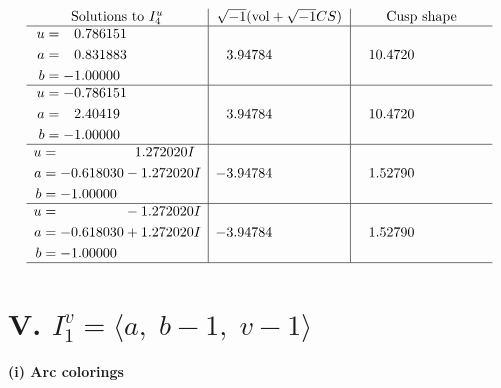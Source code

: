\documentclass[1p]{elsarticle_modified}
\theoremstyle{definition}
\newcommand{\I}{\sqrt{-1}}
\begin{document}
$$\begin{array}{c|c|c}  
\text{Solutions to }I^u_{4}& \I (\text{vol} + \sqrt{-1}CS) & \text{Cusp shape}\\
 \hline 
\begin{aligned}
u &= \phantom{-}0.786151\phantom{ +0.000000I} \\
a &= \phantom{-}0.831883\phantom{ +0.000000I} \\
b &= -1.00000\phantom{ +0.000000I}\end{aligned}
 & \phantom{-}3.94784\phantom{ +0.000000I} & \phantom{-}10.4720\phantom{ +0.000000I} \\ \hline\begin{aligned}
u &= -0.786151\phantom{ +0.000000I} \\
a &= \phantom{-}2.40419\phantom{ +0.000000I} \\
b &= -1.00000\phantom{ +0.000000I}\end{aligned}
 & \phantom{-}3.94784\phantom{ +0.000000I} & \phantom{-}10.4720\phantom{ +0.000000I} \\ \hline\begin{aligned}
u &= \phantom{-0.000000 -}1.272020 I \\
a &= -0.618030 - 1.272020 I \\
b &= -1.00000\phantom{ +0.000000I}\end{aligned}
 & -3.94784\phantom{ +0.000000I} & \phantom{-}1.52790\phantom{ +0.000000I} \\ \hline\begin{aligned}
u &= \phantom{-0.000000 } -1.272020 I \\
a &= -0.618030 + 1.272020 I \\
b &= -1.00000\phantom{ +0.000000I}\end{aligned}
 & -3.94784\phantom{ +0.000000I} & \phantom{-}1.52790\phantom{ +0.000000I}\\
 \hline 
 \end{array}$$\newpage\newpage\renewcommand{\arraystretch}{1}
\centering \section*{V. $I^v_{1}= \langle a,\;b-1,\;v-1 \rangle$}
\flushleft \textbf{(i) Arc colorings}\\
\end{document}
